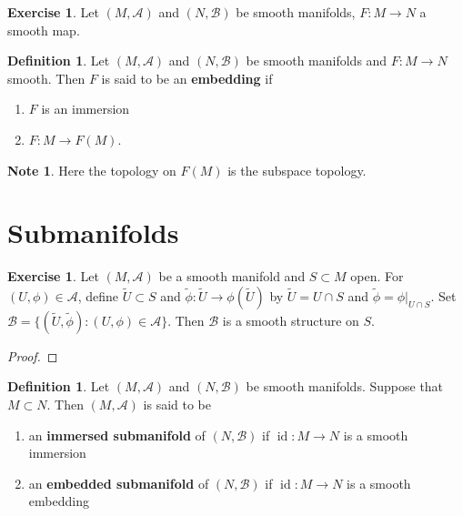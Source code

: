 \documentclass{book}
\theoremstyle{definition}
\newtheorem{defn}[definition]{Definition}
\newtheorem{note}[definition]{Note}
\newtheorem{ex}[definition]{Exercise}
\newcommand{\MA}{\mathcal{A}}
\newcommand{\MB}{\mathcal{B}}
\DeclareMathOperator{\id}{id}
\DeclareMathOperator*{\0}{\mbf{0}}
\DeclareMathOperator*{\1}{\mbf{1}}
\newcommand{\tbf}[1]{\textbf{#1}}
\begin{document}
	\begin{ex}
	Let $(M, \MA)$ and $(N, \MB)$ be smooth manifolds, $F: M \rightarrow N$ a smooth map. 
	\end{ex}
	
	\begin{defn}
	Let $(M, \MA)$ and $(N, \MB)$ be smooth manifolds and $F:M \rightarrow N$ smooth. Then $F$ is said to be an \tbf{embedding} if 
	\begin{enumerate}
	\item $F$ is an immersion
	\item $F:M \rightarrow F(M)$. 
\end{enumerate}	 
	\end{defn}	

	\begin{note}
	Here the topology on $F(M)$ is the subspace topology.
	\end{note}
	

	
	
	
	
	
	
	
	
	
	
	\newpage
	\section{Submanifolds}
	
	
	\begin{ex}
	Let $(M, \MA)$ be a smooth manifold and $S \subset M$ open. For $(U, \phi) \in \MA$, define $\tilde{U} \subset S$ and $\tilde{\phi}: \tilde{U} \rightarrow \phi(\tilde{U})$ by $\tilde{U} = U \cap S$ and $\tilde{\phi} = \phi|_{U \cap S}$. Set $\MB = \{(\tilde{U}, \tilde{\phi}): (U, \phi) \in \MA\}$.
	Then $\MB$ is a smooth structure on $S$.
	\end{ex}
	
	\begin{proof}
	
	\end{proof}
	
	
	
	\newpage

	\begin{defn}
		Let $(M, \MA)$ and  $(N, \MB)$ be smooth manifolds. Suppose that $M \subset N$. Then $(M, \MA)$ is said to be 
		\begin{enumerate}
		\item an \tbf{immersed submanifold} of $(N, \MB)$ if $\id:M \rightarrow N$ is a smooth immersion
		\item an \tbf{embedded submanifold} of $(N, \MB)$ if $\id:M \rightarrow N$ is a smooth embedding
		\end{enumerate}
	\end{defn}
	
\end{document}
